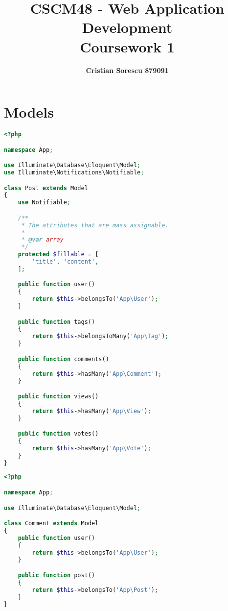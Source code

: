 \documentclass[11pt, oneside]{article}   	%
\title{\textbf{CSCM48 - Web Application Development} \\ Coursework 1}
\author{\bf Cristian Sorescu 879091}
\begin{document}
\maketitle

\newpage
\tableofcontents
\newpage

\section{Models}
\begin{lstlisting}[showstringspaces=false, title=Post.java, language=PHP, frame=single]
<?php

namespace App;

use Illuminate\Database\Eloquent\Model;
use Illuminate\Notifications\Notifiable;

class Post extends Model
{
    use Notifiable;

    /**
     * The attributes that are mass assignable.
     *
     * @var array
     */
    protected $fillable = [
        'title', 'content',
    ];

    public function user()
    {
        return $this->belongsTo('App\User');
    }

    public function tags()
    {
        return $this->belongsToMany('App\Tag');
    }

    public function comments()
    {
        return $this->hasMany('App\Comment');
    }

    public function views()
    {
        return $this->hasMany('App\View');
    }

    public function votes()
    {
        return $this->hasMany('App\Vote');
    }
}
\end{lstlisting}

\begin{lstlisting}[showstringspaces=false, title=Comment.java, language=PHP, frame=single]
<?php

namespace App;

use Illuminate\Database\Eloquent\Model;

class Comment extends Model
{
    public function user()
    {
        return $this->belongsTo('App\User');
    }

    public function post()
    {
        return $this->belongsTo('App\Post');
    }
}
\end{lstlisting}
\end{document}
